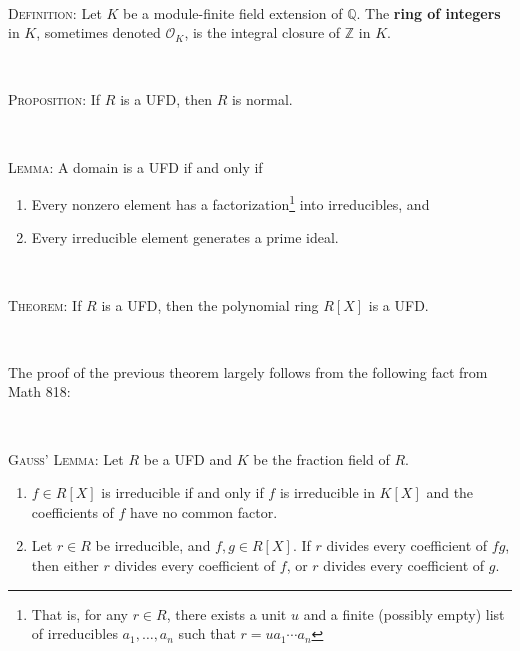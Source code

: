 \documentclass[12pt]{amsart}
\newcommand{\Q}{\mathbb{Q}}
\newcommand{\Z}{\mathbb{Z}}
\newcommand{\0}{$\phantom{.}$}
\newcommand{\1}{\mathbbm{1}}
\begin{document}
\

\noindent \textsc{Definition:} Let $K$ be a module-finite field extension of $\Q$. The \textbf{ring of integers} in $K$, sometimes denoted $\mathcal{O}_K$, is the integral closure of $\Z$ in $K$.


\

\noindent \textsc{Proposition:} If $R$ is a UFD, then $R$ is normal.

\

\noindent \textsc{Lemma:} A domain is a UFD if and only if
\begin{enumerate}
\item Every nonzero element has a factorization\footnote{That is, for any $r\in R$, there exists a unit $u$ and a finite (possibly empty) list of irreducibles $a_1,\dots,a_n$ such that $r=u a_1 \cdots a_n$} into irreducibles, and
\item Every irreducible element generates a prime ideal.
\end{enumerate}

\

\noindent \textsc{Theorem:} If $R$ is a UFD, then the polynomial ring $R[X]$ is a UFD.

\

\noindent The proof of the previous theorem largely follows from the following fact from Math 818:

\

\noindent \textsc{Gauss' Lemma:} Let $R$ be a UFD and $K$ be the fraction field of $R$.
\begin{enumerate}
\item $f\in R[X]$ is irreducible if and only if $f$ is irreducible in $K[X]$ and the coefficients of $f$ have no common factor.
\item Let $r\in R$ be irreducible, and $f,g\in R[X]$. If $r$ divides every coefficient of $fg$, then either $r$ divides every coefficient of $f$, or $r$ divides every coefficient of $g$.
\end{enumerate}

\vfill
\end{document}
